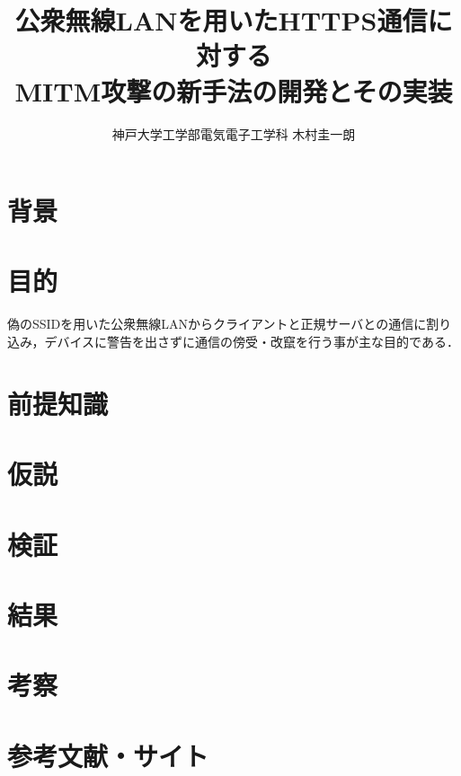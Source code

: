 \documentclass[dvipdfmx]{jsarticle}
\title{公衆無線LANを用いたHTTPS通信に対する\\MITM攻撃の新手法の開発とその実装}
\author{神戸大学工学部電気電子工学科 木村圭一朗}
\begin{document}
    \maketitle
    \tableofcontents
    \section{背景}

    \section{目的}
    偽のSSIDを用いた公衆無線LANからクライアントと正規サーバとの通信に割り込み，デバイスに警告を出さずに通信の傍受・改竄を行う事が主な目的である．
    \section{前提知識}

    \section{仮説}

    \section{検証}
    
    \section{結果}

    \section{考察}

    \section{参考文献・サイト}
\end{document}
